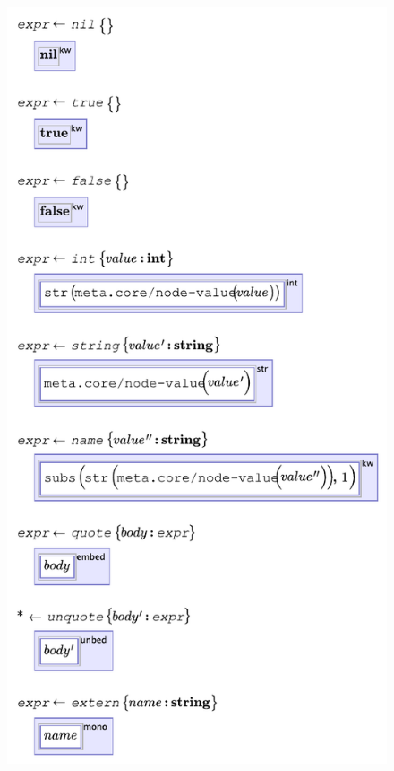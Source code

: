 \begin{figure}
\begin{minipage}[t]{0.48\linewidth}
  \vspace{0pt}
  \includegraphics[scale=0.65]{src/image/kernel1.pdf}
  \end{minipage}
  


\end{figure}
